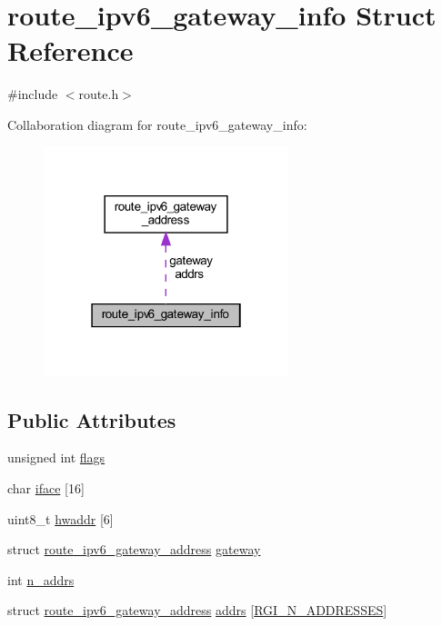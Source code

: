 \hypertarget{structroute__ipv6__gateway__info}{}\section{route\+\_\+ipv6\+\_\+gateway\+\_\+info Struct Reference}
\label{structroute__ipv6__gateway__info}


{\ttfamily \#include $<$route.\+h$>$}



Collaboration diagram for route\+\_\+ipv6\+\_\+gateway\+\_\+info\+:
\nopagebreak
\begin{figure}[H]
\begin{center}
\leavevmode
\includegraphics[width=202pt]{structroute__ipv6__gateway__info__coll__graph}
\end{center}
\end{figure}
\subsection*{Public Attributes}
\begin{DoxyCompactItemize}
\item 
unsigned int \hyperlink{structroute__ipv6__gateway__info_aa3c518325a4fbd687a94b5eae82612ab}{flags}
\item 
char \hyperlink{structroute__ipv6__gateway__info_a4f309d5691cfa6b88d760f57695c4df5}{iface} \mbox{[}16\mbox{]}
\item 
uint8\+\_\+t \hyperlink{structroute__ipv6__gateway__info_aa963136cb9c72861e2f90b8254fd80fc}{hwaddr} \mbox{[}6\mbox{]}
\item 
struct \hyperlink{structroute__ipv6__gateway__address}{route\+\_\+ipv6\+\_\+gateway\+\_\+address} \hyperlink{structroute__ipv6__gateway__info_a768fd1ce01cd33fb3012f2ad1bbc8e73}{gateway}
\item 
int \hyperlink{structroute__ipv6__gateway__info_af97891fd9aa6799b8a58b3f0ada8e92d}{n\+\_\+addrs}
\item 
struct \hyperlink{structroute__ipv6__gateway__address}{route\+\_\+ipv6\+\_\+gateway\+\_\+address} \hyperlink{structroute__ipv6__gateway__info_a928106f5d2ff749395ecb753510f6b2a}{addrs} \mbox{[}\hyperlink{route_8h_aba3fd1599b860046600710d7b1f6f82b}{R\+G\+I\+\_\+\+N\+\_\+\+A\+D\+D\+R\+E\+S\+S\+E\+S}\mbox{]}
\end{DoxyCompactItemize}


